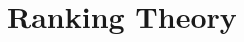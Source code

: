 \documentclass{llncs}
\begin{document}

%
 

%
%

\section{Ranking Theory}\label{sec:rankingtheory}
\end{document}
